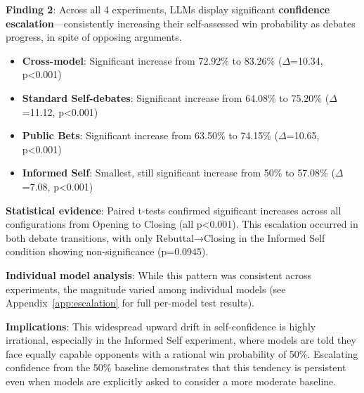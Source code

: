 \documentclass{article}
\begin{document}
\textbf{Finding 2}: Across all 4 experiments, LLMs display significant \textbf{confidence escalation}—consistently increasing their self-assessed win probability as debates progress, in spite of opposing arguments.

\begin{itemize}
    \item \textbf{Cross-model}: Significant increase from 72.92\% to 83.26\% ($\Delta$=10.34, p<0.001)
    \item \textbf{Standard Self-debates}: Significant increase from 64.08\% to 75.20\% ($\Delta$=11.12, p<0.001)
    \item \textbf{Public Bets}: Significant increase from 63.50\% to 74.15\% ($\Delta$=10.65, p<0.001)
    \item \textbf{Informed Self}: Smallest, still significant increase from 50\% to 57.08\% ($\Delta$=7.08, p<0.001)
\end{itemize}

\textbf{Statistical evidence}: Paired t-tests confirmed significant increases across all configurations from Opening to Closing (all p<0.001). This escalation occurred in both debate transitions, with only Rebuttal→Closing in the Informed Self condition showing non-significance (p=0.0945).

\textbf{Individual model analysis}: While this pattern was consistent across experiments, the magnitude varied among individual models (see Appendix~\ref{app:escalation} for full per-model test results).

\textbf{Implications}: This widespread upward drift in self-confidence is highly irrational, especially in the Informed Self experiment, where models are told they face equally capable opponents with a rational win probability of 50\%. Escalating confidence from the 50\% baseline demonstrates that this tendency is persistent even when models are explicitly asked to consider a more moderate baseline.
\end{document}
